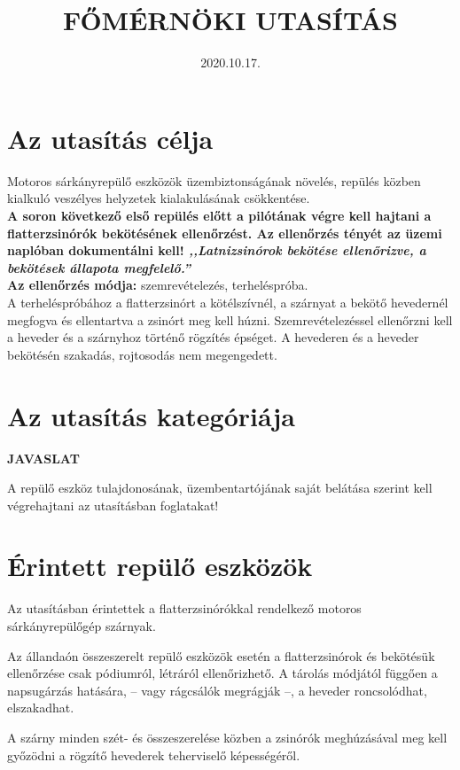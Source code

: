 \documentclass[a4paper,12pt]{report}
\title{%
    \textbf{\mksz\\FŐMÉRNÖKI UTASÍTÁS}
}
\author{}
\date{2020.10.17.}
\begin{document}
\maketitle
\pagestyle{fancy}

\section*{Az utasítás célja}
Motoros sárkányrepülő eszközök üzembiztonságának növelés, repülés közben kialkuló veszélyes helyzetek kialakulásának csökkentése.
\\

\textbf{
A soron következő első repülés előtt a pilótának végre kell hajtani a flatterzsinórók bekötésének ellenőrzést. Az ellenőrzés tényét az üzemi naplóban dokumentálni kell!
\textit{,,Latnizsinórok bekötése ellenőrizve, a bekötések állapota megfelelő.''}
}
\\

\noindent
\textbf{Az ellenőrzés módja:} szemrevételezés, terheléspróba. \\A terheléspróbához a flatterzsinórt a kötélszívnél, a szárnyat a bekötő hevedernél megfogva és ellentartva a zsinórt meg kell húzni. Szemrevételezéssel ellenőrzni kell a heveder és a szárnyhoz történő rögzítés épséget. A hevederen és a heveder bekötésén szakadás, rojtosodás nem megengedett.

\section*{Az utasítás kategóriája}
\begin{center}
\textbf{JAVASLAT}
\end{center}

A repülő eszköz tulajdonosának, üzembentartójának saját belátása szerint kell végrehajtani az utasításban foglatakat! 

\section*{Érintett repülő eszközök}
Az utasításban érintettek a flatterzsinórókkal rendelkező motoros sárkányrepülőgép szárnyak.

Az állandaón összeszerelt repülő eszközök esetén a flatterzsinórok és bekötésük ellenőrzése csak pódiumról, létráról ellenőrizhető. A tárolás módjától függően a napsugárzás hatására, -- vagy rágcsálók megrágják --, a heveder roncsolódhat, elszakadhat.

A szárny minden szét- és összeszerelése közben a zsinórók meghúzásával meg kell győzödni a rögzítő hevederek teherviselő képességéről.
\end{document}
